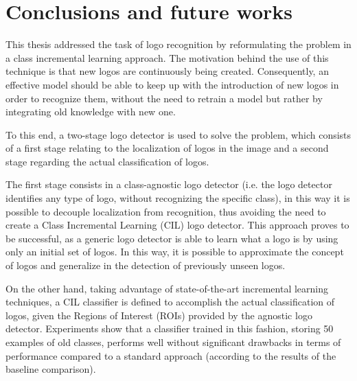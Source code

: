 \chapter{Conclusions and future works}
\label{chap:conclusions}

This thesis addressed the task of logo recognition by reformulating the problem in a class incremental learning approach.
The motivation behind the use of this technique is that new logos are continuously being created.
Consequently, an effective model should be able to keep up with the introduction of new logos in order to recognize them, without the need to retrain a model but rather by integrating old knowledge with new one.

To this end, a two-stage logo detector is used to solve the problem, which consists of a first stage relating to the localization of logos in the image and a second stage regarding the actual classification of logos.

The first stage consists in a class-agnostic logo detector (i.e. the logo detector identifies any type of logo, without recognizing the specific class), in this way it is possible to decouple localization from recognition, thus avoiding the need to create a Class Incremental Learning (CIL) logo detector. 
This approach proves to be successful, as a generic logo detector is able to learn what a logo is by using only an initial set of logos.
In this way, it is possible to approximate the concept of logos and generalize in the detection of previously unseen logos.

On the other hand, taking advantage of state-of-the-art incremental learning techniques, a CIL classifier is defined to accomplish the actual classification of logos, given the Regions of Interest (ROIs) provided by the agnostic logo detector.
Experiments show that a classifier trained in this fashion, storing 50 examples of old classes, performs well without significant drawbacks in terms of performance compared to a standard approach (according to the results of the baseline comparison).

